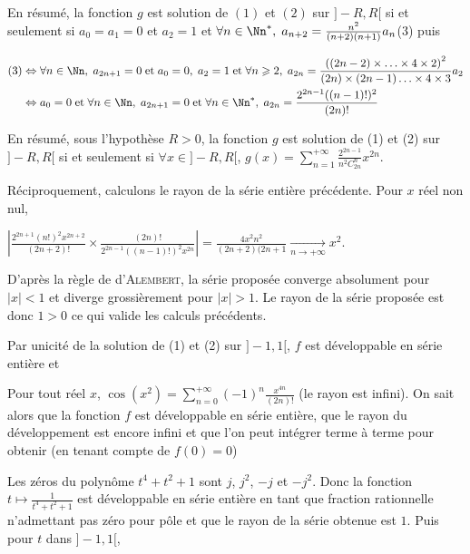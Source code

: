 {{En résumé, la fonction $g$ est solution de $(1)$ et $(2)$ sur $]-R,R[$ si et seulement si $a_0=a_1=0$ et $a_2=1$ et $\forall n\in\Nn^*,\;a_{n+2}=\frac{n^2}{(n+2)(n+1)}a_n$\quad(3) puis

\begin{align*}\ensuremath
(3)&\Leftrightarrow\forall n\in\Nn,\; a_{2n+1}= 0\;\text{et}\;a_0=0,\;a_2 =1\;\text{et}\;\forall n\geqslant2,\;a_{2n}= \frac{\left((2n-2)\times\ldots\times4\times2\right)^2}{(2n)\times(2n-1)\ldots\times4\times3}a_2\\
 &\Leftrightarrow a_0 = 0\;\text{et}\;\forall n\in\Nn,\;a_{2n+1}= 0\;\text{et}\;\forall n\in\Nn^*,\;a_{2n}=\frac{2^{2n-1}((n-1)!)^2}{(2n)!}
\end{align*}

En résumé, sous l'hypothèse $R > 0$, la fonction $g$ est solution de (1) et (2) sur $]-R,R[$ si et seulement si $\forall x\in]-R,R[$, $g(x)=\sum_{n=1}^{+\infty}\frac{2^{2n-1}}{n^2C_{2n}^n}x^{2n}$.

Réciproquement, calculons le rayon de la série entière précédente. Pour $x$ réel non nul,

\begin{center} 
$\left|\frac{2^{2n+1}(n!)^2x^{2n+2}}{(2n+2)!}\times\frac{(2n)!}{2^{2n-1}((n-1)!)^2x^{2n}}\right| = \frac{4x^2n^2}{(2n+2)(2n+1}\underset{n\rightarrow+\infty}{\rightarrow}x^2$.
\end{center}

D'après la règle de d'\textsc{Alembert}, la série proposée converge absolument pour $|x| < 1$ et diverge grossièrement pour $|x|> 1$. Le rayon de la série proposée est donc $1>0$ ce qui valide les calculs précédents.

Par unicité de la solution de (1) et (2) sur $]-1,1[$, $f$ est développable en série entière et

\begin{center}
\fbox{
$\forall x\in]-1,1[$, $\Arcsin^2x=\sum_{n=1}^{+\infty}\frac{2^{2n-1}}{n^2C_{2n}^n}x^{2n}$.
}
\end{center}
Pour tout réel $x$, $\cos(x^2) =\sum_{n=0}^{+\infty}(-1)^n\frac{x^{4n}}{(2n)!}$ (le rayon est infini).
On sait alors que la fonction $f$ est développable en série entière, que le rayon du développement est encore infini et que l'on peut intégrer terme à terme pour obtenir (en tenant compte de $f(0)=0$) 

\begin{center}
\end{center}
Les zéros du polynôme $t^4+t^2 + 1$ sont  $j$, $j^2$, $-j$ et $-j^2$. Donc la fonction $t\mapsto\frac{1}{t^4+t^2+1}$ est développable en série entière en tant que fraction rationnelle n'admettant pas zéro pour pôle et que le rayon de la série obtenue est $1$. Puis pour $t$ dans $]-1,1[$, 

}}
